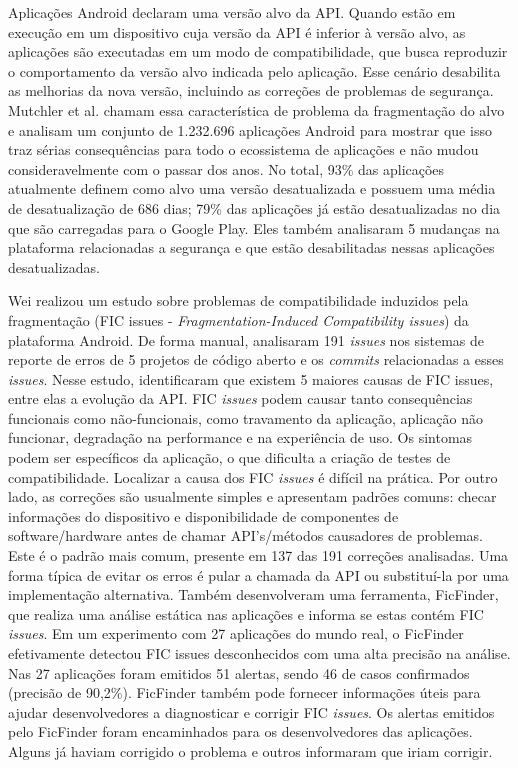 Aplicações Android declaram uma versão alvo da API. Quando estão em execução em
um dispositivo cuja versão da API é inferior à versão alvo, as aplicações são
executadas em um modo de compatibilidade, que busca reproduzir o comportamento
da versão alvo indicada pelo aplicação. Esse cenário desabilita as melhorias da
nova versão, incluindo as correções de problemas de segurança. Mutchler et al.
\cite{Mutchler2016}
chamam essa característica de problema da fragmentação do alvo e analisam um
conjunto de 1.232.696 aplicações Android para mostrar que isso traz sérias
consequências para todo o ecossistema de aplicações e não mudou consideravelmente
com o 
passar dos anos. No total, 93\% das aplicações atualmente definem como alvo uma
versão desatualizada e possuem uma média de desatualização de 686 dias; 79\% das
aplicações já estão desatualizadas no dia que são carregadas para o Google Play.
Eles também analisaram 5 mudanças na plataforma relacionadas a segurança e que estão
desabilitadas nessas aplicações desatualizadas.

Wei \cite{Wei2016} realizou um estudo sobre problemas de compatibilidade induzidos
pela fragmentação 
(FIC issues - \textit{Fragmentation-Induced Compatibility issues}) da plataforma
Android.
De forma manual, analisaram 191 \textit{issues} nos sistemas de reporte de erros
de 5 projetos de código aberto e os \textit{commits} relacionadas a esses \textit{issues}.
Nesse estudo, identificaram que existem 5 maiores causas de FIC issues, entre elas
a evolução da API. FIC \textit{issues} podem causar tanto consequências funcionais como
não-funcionais, como travamento da aplicação, aplicação não funcionar, degradação
na performance e na experiência de uso. Os sintomas podem ser específicos da aplicação,
o que dificulta a criação de testes de compatibilidade. Localizar a causa dos FIC
\textit{issues} é difícil na prática. Por outro lado, as correções são usualmente
simples e apresentam padrões comuns: checar informações do dispositivo e disponibilidade
de componentes de software/hardware antes de chamar API's/métodos causadores de
problemas. Este é o padrão mais comum, presente em 137 das 191 correções analisadas.
Uma forma típica de evitar os erros é pular a chamada da API ou substituí-la por
uma implementação alternativa. Também desenvolveram uma ferramenta, FicFinder, que
realiza uma análise estática nas aplicações e informa se estas contém FIC
\textit{issues}. Em um experimento com 27 aplicações do mundo real, o FicFinder
efetivamente detectou FIC issues desconhecidos com
uma alta precisão na análise. Nas 27 aplicações foram emitidos 51 alertas, sendo
46 de casos confirmados (precisão de 90,2\%). FicFinder também pode fornecer
informações úteis para ajudar desenvolvedores a diagnosticar e corrigir FIC
\textit{issues}. Os alertas emitidos pelo FicFinder foram encaminhados para os
desenvolvedores das aplicações. Alguns já haviam corrigido o problema e outros
informaram que iriam corrigir.

